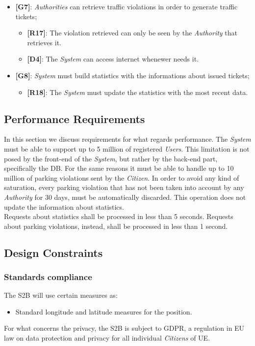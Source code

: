 \documentclass{article}
\begin{document}
\begin{itemize}
    \item \textbf{[G7]}: \textit{Authorities} can retrieve traffic violations in order to generate traffic tickets;
    \begin{itemize}
        \item \textbf{[R17]}: The violation retrieved can only be seen by the \textit{Authority} that retrieves it.
        \item \textbf{[D4]}: The \textit{System} can access internet whenewer needs it.
    \end{itemize}

    \item \textbf{[G8]}: \textit{System} must build statistics with the informations about issued tickets;
    \begin{itemize}
        \item \textbf{[R18]}: The \textit{System} must update the statistics with the most recent data.
    \end{itemize}
\end{itemize}

\subsection{Performance Requirements}
In this section we discuss requirements for what regards performance. The \textit{System} must be able to support up to
5 million of registered \textit{Users}. This limitation is not posed by the front-end of the \textit{System}, but rather by the 
back-end part, specifically the DB. For the same reasons it must be able to handle up to 10 million of parking violations 
sent by the \textit{Citizen}. In order to avoid any kind of saturation, every parking violation that has not been taken into account
by any \textit{Authority} for 30 days, must be automatically discarded. This operation does not update the information about 
statistics.
 \\Requests about statistics shall be processed in less than 5 seconds. Requests about parking violations, instead, shall be processed 
 in less than 1 second.     

\subsection{Design Constraints}
\subsubsection{Standards compliance}
The S2B  will use certain measures as:
\begin{itemize}
    \item Standard longitude and latitude measures for the position.
\end{itemize}
For what concerns the privacy, the S2B is subject to GDPR, a regulation in EU law on data protection 
and privacy for all individual \textit{Citizens} of UE.  
\end{document}
